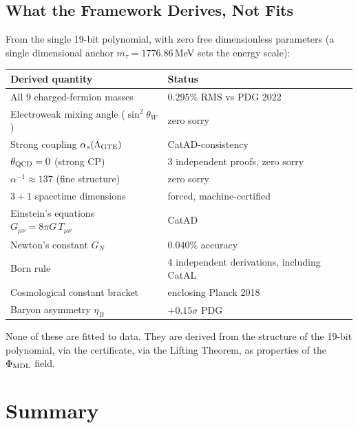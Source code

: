 \documentclass[11pt,a4paper]{article}
\newcommand{\PhiMDL}{\Phi_{\rm MDL}}
\theoremstyle{definition}
\begin{document}
\subsection{What the Framework Derives, Not Fits}

From the single 19-bit polynomial, with zero free dimensionless parameters
(a single dimensional anchor $m_\tau = 1776.86$\,MeV sets the energy scale):

\begin{center}
\begin{tabular}{@{}ll@{}}
\toprule
\textbf{Derived quantity} & \textbf{Status} \\
\midrule
All 9 charged-fermion masses & $0.295\%$ RMS vs PDG 2022 \\
Electroweak mixing angle ($\sin^2\theta_W$) & zero sorry \\
Strong coupling $\alpha_s(\Lambda_{\rm GTE})$ & CatAD-consistency \\
$\theta_{\rm QCD} = 0$ (strong CP) & 3 independent proofs, zero sorry \\
$\alpha^{-1} \approx 137$ (fine structure) & zero sorry \\
$3+1$ spacetime dimensions & forced, machine-certified \\
Einstein's equations $G_{\mu\nu} = 8\pi G\,T_{\mu\nu}$ & CatAD \\
Newton's constant $G_N$ & $0.040\%$ accuracy \\
Born rule & 4 independent derivations, including CatAL \\
Cosmological constant bracket & enclosing Planck 2018 \\
Baryon asymmetry $\eta_B$ & $+0.15\sigma$ PDG \\
\bottomrule
\end{tabular}
\end{center}

None of these are fitted to data.  They are derived from the structure of the
19-bit polynomial, via the certificate, via the Lifting Theorem, as properties
of the $\PhiMDL$ field.

\section{Summary}
\label{sec:summary}
\end{document}

